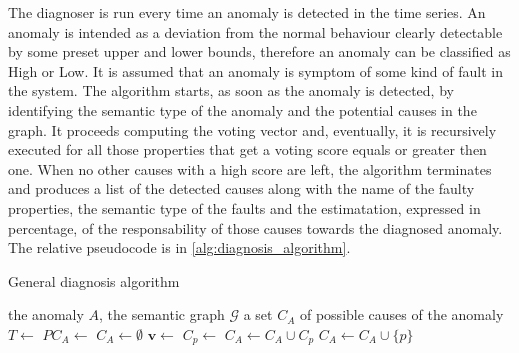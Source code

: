 The diagnoser is run every time an anomaly is detected in the time series. An anomaly is intended as a deviation from the normal behaviour clearly detectable by some preset upper and lower bounds, therefore an anomaly can be classified as High or Low.
It is assumed that an anomaly is symptom of some kind of fault in the system. The algorithm starts, as soon as the anomaly is detected, by identifying the semantic type of the anomaly and the potential causes in the graph. It proceeds computing the voting vector and, eventually, it is recursively executed for all those properties that get a voting score equals or greater then one. When no other causes with a high score are left, the algorithm terminates and produces a list of the detected causes along with the name of the faulty properties, the semantic type of the faults and the estimatation, expressed in percentage, of the responsability of those causes towards the diagnosed anomaly. The relative pseudocode is in \autoref{alg:diagnosis_algorithm}.
\begin{algorithm}
  \caption{General diagnosis algorithm}\label{alg:diagnosis_algorithm}
  \begin{algorithmic}[1]
    \Require
      \Statex the anomaly $A$,
      \Statex the semantic graph $\mathcal{G}$
    \Ensure a set $C_A$ of possible causes of the anomaly
    \State $T\leftarrow$ 
    \State $PC_A\leftarrow$ 
    \State $C_A\leftarrow\emptyset$
    \State $\bm v\leftarrow$ 
    \State $C_p\leftarrow$  
    \State $C_A\leftarrow C_A\cup C_p$
    \Else
    \State $C_A\leftarrow C_A\cup\{p\}$ 
    \EndIf
    \EndIf
    \EndFor
    \EndProcedure
  \end{algorithmic}
\end{algorithm}
